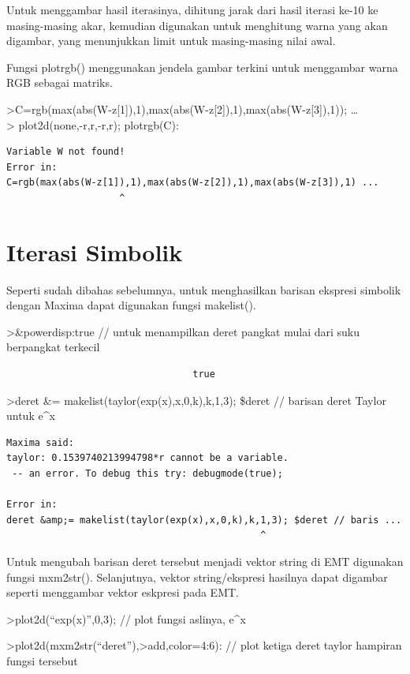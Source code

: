 \documentclass[
]{book}
\begin{document}
Untuk menggambar hasil iterasinya, dihitung jarak dari hasil iterasi ke-10 ke masing-masing akar, kemudian digunakan untuk menghitung warna yang akan digambar, yang menunjukkan limit untuk masing-masing nilai awal.

Fungsi plotrgb() menggunakan jendela gambar terkini untuk menggambar warna RGB sebagai matriks.

\textgreater C=rgb(max(abs(W-z{[}1{]}),1),max(abs(W-z{[}2{]}),1),max(abs(W-z{[}3{]}),1)); \ldots{}\\
\textgreater{} plot2d(none,-r,r,-r,r); plotrgb(C):

\begin{verbatim}
Variable W not found!
Error in:
C=rgb(max(abs(W-z[1]),1),max(abs(W-z[2]),1),max(abs(W-z[3]),1) ...
                    ^
\end{verbatim}

\section{Iterasi Simbolik}\label{iterasi-simbolik}

Seperti sudah dibahas sebelumnya, untuk menghasilkan barisan ekspresi simbolik dengan Maxima dapat digunakan fungsi makelist().

\textgreater\&powerdisp:true // untuk menampilkan deret pangkat mulai dari suku berpangkat terkecil

\begin{verbatim}
                                 true    
\end{verbatim}

\textgreater deret \&= makelist(taylor(exp(x),x,0,k),k,1,3); \$deret // barisan deret Taylor untuk e\^{}x

\begin{verbatim}
Maxima said:
taylor: 0.1539740213994798*r cannot be a variable.
 -- an error. To debug this try: debugmode(true);

Error in:
deret &amp;= makelist(taylor(exp(x),x,0,k),k,1,3); $deret // baris ...
                                             ^
\end{verbatim}

Untuk mengubah barisan deret tersebut menjadi vektor string di EMT digunakan fungsi mxm2str(). Selanjutnya, vektor string/ekspresi hasilnya dapat digambar seperti menggambar vektor eskpresi pada EMT.

\textgreater plot2d(``exp(x)'',0,3); // plot fungsi aslinya, e\^{}x

\textgreater plot2d(mxm2str(``deret''),\textgreater add,color=4:6): // plot ketiga deret taylor hampiran fungsi tersebut
\end{document}
